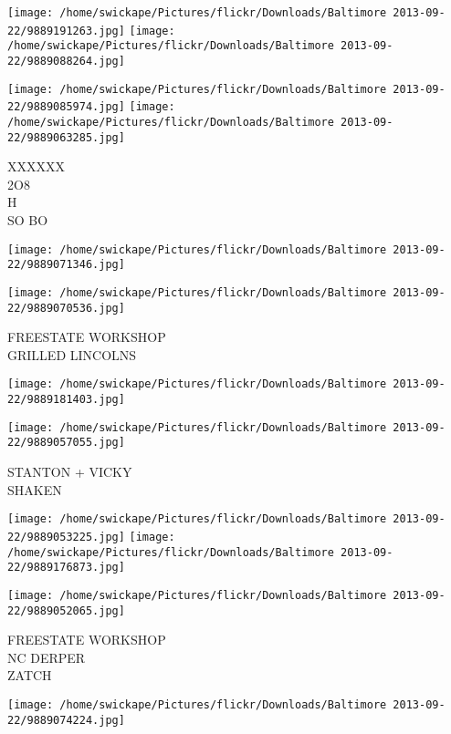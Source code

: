 \documentclass[10pt,letterpaper]{article}
\begin{document}
\texttt{[image: /home/swickape/Pictures/flickr/Downloads/Baltimore 2013-09-22/9889191263.jpg]}
\texttt{[image: /home/swickape/Pictures/flickr/Downloads/Baltimore 2013-09-22/9889088264.jpg]}

\texttt{[image: /home/swickape/Pictures/flickr/Downloads/Baltimore 2013-09-22/9889085974.jpg]}
\texttt{[image: /home/swickape/Pictures/flickr/Downloads/Baltimore 2013-09-22/9889063285.jpg]}

XXXXXX\\
2O8\\
H\\
SO BO\\
\pagebreak

\texttt{[image: /home/swickape/Pictures/flickr/Downloads/Baltimore 2013-09-22/9889071346.jpg]}

\vspace{0.25in}
\texttt{[image: /home/swickape/Pictures/flickr/Downloads/Baltimore 2013-09-22/9889070536.jpg]}

FREESTATE WORKSHOP\\
GRILLED LINCOLNS\\
\pagebreak

\texttt{[image: /home/swickape/Pictures/flickr/Downloads/Baltimore 2013-09-22/9889181403.jpg]}

\vspace{0.25in}
\texttt{[image: /home/swickape/Pictures/flickr/Downloads/Baltimore 2013-09-22/9889057055.jpg]}

STANTON + VICKY\\
SHAKEN\\
\pagebreak

\texttt{[image: /home/swickape/Pictures/flickr/Downloads/Baltimore 2013-09-22/9889053225.jpg]}
\texttt{[image: /home/swickape/Pictures/flickr/Downloads/Baltimore 2013-09-22/9889176873.jpg]}

\texttt{[image: /home/swickape/Pictures/flickr/Downloads/Baltimore 2013-09-22/9889052065.jpg]}

FREESTATE WORKSHOP\\
NC DERPER\\
ZATCH\\
\pagebreak

\texttt{[image: /home/swickape/Pictures/flickr/Downloads/Baltimore 2013-09-22/9889074224.jpg]}
\end{document}
